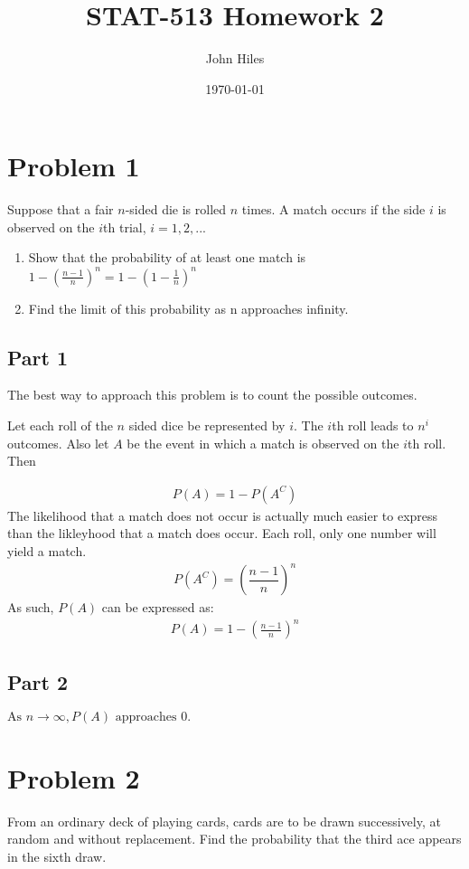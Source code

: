 \documentclass{article}
\title{STAT-513 Homework 2}
\author{John Hiles}
\date\today
\begin{document}
\maketitle %


\section*{Problem 1}
Suppose that a fair $n$-sided die is rolled $n$ times. A match occurs if the side $i$ is observed on the $i$th trial, $i=1,2,...$
\begin{enumerate}
\item
Show that the probability of at least one match is $1-(\frac{n-1}{n})^n = 1-(1-\frac{1}{n})^n$
\item
Find the limit of this probability as n approaches infinity.
\end{enumerate}

\subsection*{Part 1}
The best way to approach this problem is to count the possible outcomes. 

Let each roll of the $n$ sided dice be represented by $i$. The $i$th roll leads to $n^i$ outcomes.
Also let $A$ be the event in which a match is observed on the $i$th roll. Then

\begin{align*}
P(A) = 1-P(A^C)
\end{align*}
The likelihood that a match does not occur is actually much easier to express than the likleyhood that a match does occur. Each roll, only one number will yield a match.
\begin{align*}
P(A^C) = (\dfrac{n-1}{n})^n
\end{align*}
As such, $P(A)$ can be expressed as:
\begin{align*}
\boxed{P(A) = 1-(\frac{n-1}{n})^n}
\end{align*}

\subsection*{Part 2}
$\boxed{\text{As }n\to\infty, P(A)\text{ approaches }0.}$

\clearpage

\section*{Problem 2}
From an ordinary deck of playing cards, cards are to be drawn successively, at random and without replacement. Find the probability that the third ace appears in the sixth draw.
\end{document}
